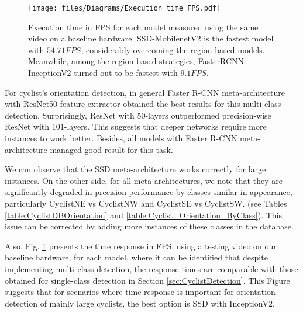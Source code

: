 \documentclass[journal]{IEEEtran}
\begin{document}
\begin{figure}[ht!]
\begin{center}
  \texttt{[image: files/Diagrams/Execution\_time\_FPS.pdf]}
\caption{Execution time in FPS for each model measured using the same video on a baseline hardware. SSD-MobilenetV2 is the fastest model with $54.71 FPS$, considerably overcoming the region-based models. Meanwhile, among the  region-based strategies, FasterRCNN-InceptionV2 turned out to be fastest with $9.1FPS$.}
\label{fig:Cyclist_Orientation_FPS}       \end{center}
\end{figure}

For cyclist's orientation detection, in general Faster R-CNN meta-architecture with ResNet50 feature extractor obtained the best results for this multi-class detection. Surprisingly, ResNet with 50-layers outperformed precision-wise ResNet with 101-layers. This suggests that deeper networks require more instances to work better. Besides, all models with Faster R-CNN meta-architecture managed good result for this task. 



We can observe that the SSD meta-architecture works correctly for large instances. On the other side, for all meta-architectures, we note that they are significantly degraded in precision performance  by classes similar in appearance, particularly CyclistNE vs CyclistNW and CyclistSE vs CyclistSW. (see Tables \ref{table:CyclistDBOrientation} and \ref{table:Cyclist_Orientation_ByClass}). This issue can be corrected by adding more instances of these classes in the database.



Also, Fig. \ref{fig:Cyclist_Orientation_FPS} presents the time response in FPS, using a testing video on our baseline hardware, for each model, where it can be identified that despite implementing multi-class detection, the response times are comparable with those obtained for single-class detection in Section \ref{sec:CyclistDetection}. This Figure suggests that for scenarios where time response is important for orientation detection of mainly large cyclists, the best option is SSD with InceptionV2.
\end{document}
